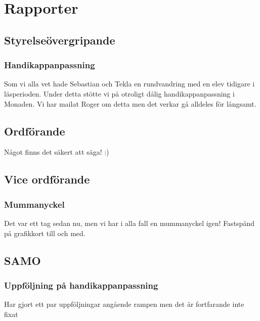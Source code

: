 \documentclass[protokoll]{dvd}
\begin{document}
\newpage

\section{Rapporter}

    \subsection{Styrelseövergripande}

        \subsubsection{Handikappanpassning}
        Som vi alla vet hade Sebastian och Tekla en rundvandring med en elev tidigare i läsperioden.
        Under detta stötte vi på otroligt dålig handikappanpassning i Monaden.
        Vi har mailat Roger om detta men det verkar gå alldeles för långsamt.

\newpage

    \subsection{Ordförande}
        Något finns det säkert att säga! :)

    \subsection{Vice ordförande}

        \subsubsection*{Mummanyckel}
        Det var ett tag sedan nu, men vi har i alla fall en mummanyckel igen!
        Fastspänd på grafikkort till och med.


    \subsection{SAMO}

        \subsubsection*{Uppföljning på handikappanpassning}
            Har gjort ett par uppföljningar angående rampen men det är fortfarande inte fixat

\newpage

\end{document}
